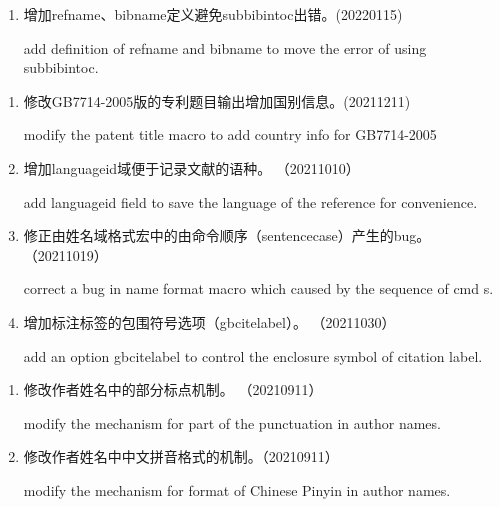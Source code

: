 

\label{up:latest}

\begin{enumerate}

\item 增加refname、bibname定义避免subbibintoc出错。(20220115)

add definition of refname and bibname to move the error of using subbibintoc.

\end{enumerate}


\label{up:20211211}

\begin{enumerate}

\item 修改GB7714-2005版的专利题目输出增加国别信息。(20211211)

modify the patent title macro to add country info for GB7714-2005

\item 增加languageid域便于记录文献的语种。 （20211010）

add languageid field to save the language of the reference for convenience.

\item 修正由姓名域格式宏中的由命令顺序（sentencecase）产生的bug。 （20211019）

correct a bug in name format macro which caused by the sequence of cmd
s.

\item 增加标注标签的包围符号选项（gbcitelabel）。 （20211030）

add an option gbcitelabel to control the enclosure symbol of citation label.

\end{enumerate}


\label{up:20210911}

\begin{enumerate}
\item 修改作者姓名中的部分标点机制。 （20210911）

modify the mechanism for part of the punctuation in author names.

\item 修改作者姓名中中文拼音格式的机制。（20210911）

modify the mechanism for format of Chinese Pinyin in author names.

\end{enumerate}



